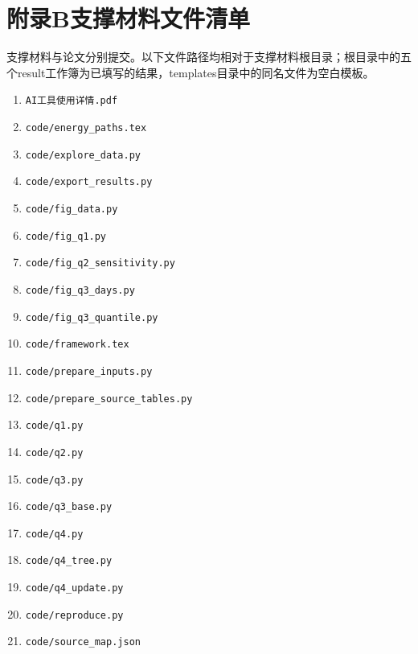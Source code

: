 \clearpage
\begingroup
\setmonofont{Consolas}
\section*{附录B\quad 支撑材料文件清单}
支撑材料与论文分别提交。以下文件路径均相对于支撑材料根目录；根目录中的五个result工作簿为已填写的结果，templates目录中的同名文件为空白模板。

\begingroup
\small{}
\begin{enumerate}[label=\arabic*.,leftmargin=2.5em,itemsep=2pt]
\item \texttt{AI工具使用详情.pdf}
\item \texttt{code/\allowbreak{}energy\_\allowbreak{}paths.tex}
\item \texttt{code/\allowbreak{}explore\_\allowbreak{}data.py}
\item \texttt{code/\allowbreak{}export\_\allowbreak{}results.py}
\item \texttt{code/\allowbreak{}fig\_\allowbreak{}data.py}
\item \texttt{code/\allowbreak{}fig\_\allowbreak{}q1.py}
\item \texttt{code/\allowbreak{}fig\_\allowbreak{}q2\_\allowbreak{}sensitivity.py}
\item \texttt{code/\allowbreak{}fig\_\allowbreak{}q3\_\allowbreak{}days.py}
\item \texttt{code/\allowbreak{}fig\_\allowbreak{}q3\_\allowbreak{}quantile.py}
\item \texttt{code/\allowbreak{}framework.tex}
\item \texttt{code/\allowbreak{}prepare\_\allowbreak{}inputs.py}
\item \texttt{code/\allowbreak{}prepare\_\allowbreak{}source\_\allowbreak{}tables.py}
\item \texttt{code/\allowbreak{}q1.py}
\item \texttt{code/\allowbreak{}q2.py}
\item \texttt{code/\allowbreak{}q3.py}
\item \texttt{code/\allowbreak{}q3\_\allowbreak{}base.py}
\item \texttt{code/\allowbreak{}q4.py}
\item \texttt{code/\allowbreak{}q4\_\allowbreak{}tree.py}
\item \texttt{code/\allowbreak{}q4\_\allowbreak{}update.py}
\item \texttt{code/\allowbreak{}reproduce.py}
\item \texttt{code/\allowbreak{}source\_\allowbreak{}map.json}

\end{enumerate}
